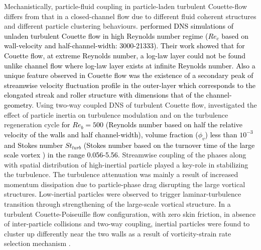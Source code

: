 \documentclass[aip,graphicx]{revtex4-1}
\begin{document}
   Mechanistically, particle-fluid coupling in particle-laden turbulent Couette-flow differs from that in a closed-channel flow due to different fluid coherent structures and different particle clustering behaviours. \textcolor{black}{\citet*{pirozzoli2011large} performed DNS simulations of unladen turbulent Couette flow in high Reynolds number regime ($Re_c$
   based on wall-velocity and half-channel-width: 3000-21333). Their work showed that for Couette flow, at extreme Reynolds number, a log-law layer could not be found unlike channel flow where log-law layer exists at infinite Reynolds number. Also a unique feature observed in Couette flow was the existence of a secondary peak of streamwise velocity fluctuation profile in the outer-layer which corresponds to the elongated streak and roller structure with dimensions that of the channel-geometry}. Using two-way coupled DNS of turbulent Couette flow, \citet*{wang2019modulation} investigated the effect of particle inertia on turbulence modulation and on the turbulence regeneration cycle \textcolor{black}{for $Re_b=500$ (Reynolds number based on half the relative velocity of the walls and half channel-width), volume fraction ($\phi_v$) less than $10^{-3}$ and Stokes number $St_{turb}$ (Stokes number based on the turnover time of the large scale vortex ) in the range 0.056-5.56}. Streamwise coupling of the phases along with spatial distribution of high-inertial particle played a key-role in stabilizing the turbulence. The turbulence attenuation was mainly a result of increased momentum dissipation due to particle-phase drag disrupting the large vortical structures. Low-inertial particles were observed to trigger laminar-turbulence transition through strengthening of the large-scale vortical structure. In a turbulent Couette-Poiseuille flow configuration, with zero skin friction, in absence of inter-particle collisions and two-way coupling, inertial particles were found to cluster up differently near the two walls as a result of vorticity-strain rate selection mechanism  \citep*{yang2017preferential}. 
\end{document}
